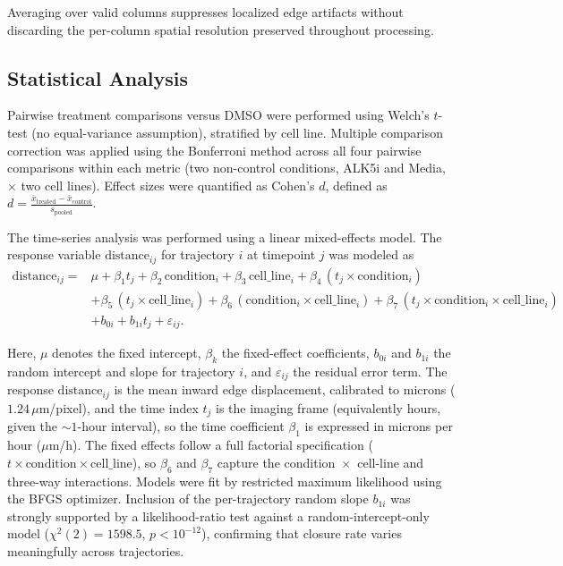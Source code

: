 Averaging over valid columns suppresses localized edge artifacts without discarding the per-column spatial resolution preserved throughout processing.


\subsection{Statistical Analysis}

Pairwise treatment comparisons versus DMSO were performed using Welch's $t$-test
(no equal-variance assumption), stratified by cell line.
Multiple comparison correction was applied using the Bonferroni method across all four
pairwise comparisons within each metric (two non-control conditions, ALK5i and Media,
$\times$ two cell lines).
Effect sizes were quantified as Cohen's $d$, defined as $d = \frac{\bar{x}_\text{treated} - \bar{x}_\text{control}}{s_\text{pooled}}$.

The time-series analysis was performed using a linear mixed-effects model. The response variable $\mathrm{distance}_{ij}$ for trajectory $i$ at timepoint $j$ was modeled as
\begin{equation}
\begin{aligned}
\mathrm{distance}_{ij}
= {}& \mu
+ \beta_1 t_j
+ \beta_2 \,\mathrm{condition}_i
+ \beta_3 \,\mathrm{cell\_line}_i
+ \beta_4 \,(t_j \times \mathrm{condition}_i) \\
& + \beta_5 \,(t_j \times \mathrm{cell\_line}_i)
+ \beta_6 \,(\mathrm{condition}_i \times \mathrm{cell\_line}_i)
+ \beta_7 \,(t_j \times \mathrm{condition}_i \times \mathrm{cell\_line}_i) \\
& + b_{0i}
+ b_{1i} t_j
+ \varepsilon_{ij}.
\end{aligned}
\label{eq:mixed-model}
\end{equation}

Here, $\mu$ denotes the fixed intercept, $\beta_k$ the fixed-effect coefficients, $b_{0i}$ and $b_{1i}$ the random intercept and slope for trajectory $i$, and $\varepsilon_{ij}$ the residual error term. The response $\mathrm{distance}_{ij}$ is the mean inward edge displacement, calibrated to microns ($1.24\,\mu$m/pixel), and the time index $t_j$ is the imaging frame (equivalently hours, given the ${\sim}1$-hour interval), so the time coefficient $\beta_1$ is expressed in microns per hour ($\mu$m/h). The fixed effects follow a full factorial specification ($t \times \mathrm{condition} \times \mathrm{cell\_line}$), so $\beta_6$ and $\beta_7$ capture the condition~$\times$~cell-line and three-way interactions. Models were fit by restricted maximum likelihood using the BFGS optimizer. Inclusion of the per-trajectory random slope $b_{1i}$ was strongly supported by a likelihood-ratio test against a random-intercept-only model ($\chi^2(2) = 1598.5$, $p < 10^{-12}$), confirming that closure rate varies meaningfully across trajectories.

